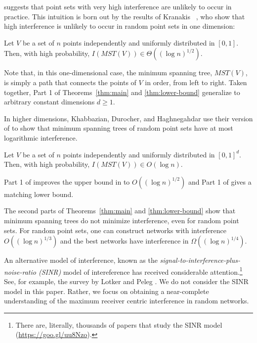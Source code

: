 \documentclass{patmorin}
\newcommand{\mst}{\mathit{MST}}
\begin{document}
 suggests that point sets with very high interference are
unlikely to occur in practice.  This intuition is born out by the results
of Kranakis \etal\ \cite{kkmns10}, who show that high interference is
unlikely to occur in random point sets in one dimension:
\begin{thm}
  Let $V$ be a set of $n$ points independently and uniformly distributed
  in $[0,1]$.  Then, with high probability, $I(\mst(V))\in \Theta((\log
  n)^{1/2})$.
\end{thm}
Note that, in this one-dimensional case, the minimum spanning tree,
$\mst(V)$, is simply a path that connects the points of $V$ in order,
from left to right.  Taken together, Part 1 of Theorems~\ref{thm:main}
and \ref{thm:lower-bound} generalize  to arbitrary
constant dimensions $d\ge 1$.

In higher dimensions, Khabbazian, Durocher, and Haghnegahdar \cite{kdhk15}
use their version of  to show that minimum spanning trees
of random point sets have at most logarithmic interference.
\begin{thm}
  Let $V$ be a set of $n$ points independently and uniformly distributed
  in $[0,1]^d$.  Then, with high probability, $I(\mst(V))\in O(\log n)$.
\end{thm}
Part 1 of  improves the upper bound in  to
$O((\log n)^{1/2})$ and Part 1 of  gives a matching
lower bound.

The second parts of Theorems~\ref{thm:main} and \ref{thm:lower-bound}
show that minimum spanning trees do not minimize interference, even for
random point sets.  For random point sets, one can construct networks with
interference $O((\log n)^{1/3})$ and the best networks have interference
in $\Omega((\log n)^{1/4})$.

An alternative model of interference, known as the
\emph{signal-to-interference-plus-noise-ratio (SINR)} model of
intereference has received considerable attention.\footnote{There
are, literally, thousands of papers that study the SINR model
(\url{https://goo.gl/uu8Nzo}).}   See, for example, the survey by Lotker
and Peleg \cite{lotker.peleg:structure}.  We do not consider the SINR
model in this paper.  Rather, we focus on obtaining a near-complete
understanding of the maximum receiver centric interference in random
networks.
\end{document}
